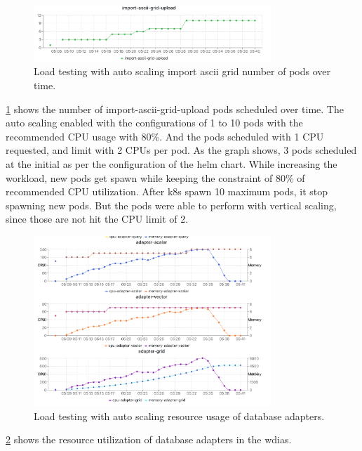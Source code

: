 \begin{figure}[htp]
    \centering
    \includegraphics[width=0.8\textwidth]{results/obs/all_auto/obs_all_auto_15m_import_grid_pod.png}
    \caption{Load testing with auto scaling import ascii grid number of pods over time.}
    \label{fi:obs_all_auto_15m_import_grid_pod}
\end{figure}
\ref{fi:obs_all_auto_15m_import_grid_pod} shows the number of import-ascii-grid-upload pods scheduled over time. The auto scaling enabled with the configurations of 1 to 10 pods with the recommended CPU usage with 80\%. And the pods scheduled with 1 CPU requested, and limit with 2 CPUs per pod.
As the graph shows, 3 pods scheduled at the initial as per the configuration of the helm chart. While increasing the workload, new pods get spawn while keeping the constraint of 80\% of recommended CPU utilization. After \acrshort{k8s} spawn 10 maximum pods, it stop spawning new pods. But the pods were able to perform with vertical scaling, since those are not hit the CPU limit of 2.

\begin{figure}[htp]
    \centering
    \includegraphics[width=0.8\textwidth]{results/obs/all_auto/obs_all_auto_15m_adapter_dbs_res.png}
    \caption{Load testing with auto scaling resource usage of database adapters.}
    \label{fi:obs_all_auto_15m_adapter_dbs_res}
\end{figure}
\ref{fi:obs_all_auto_15m_adapter_dbs_res} shows the resource utilization of database adapters in the \acrshort{wdias}.


